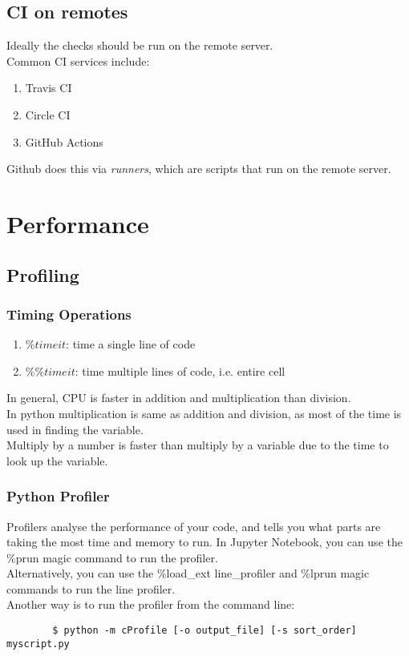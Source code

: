 \documentclass[12pt,a4paper]{article}
\begin{document}
    \subsection{CI on remotes}
    Ideally the checks should be run on the remote server.\\
    Common CI services include:
    \begin{enumerate}
        \item Travis CI
        \item Circle CI
        \item GitHub Actions
    \end{enumerate}
    Github does this via \textit{runners}, which are scripts that run on the remote server.\\

\section{Performance}
\subsection{Profiling}
    \subsubsection{Timing Operations}
    \begin{enumerate}
        \item $\% timeit$: time a single line of code
        \item $\%\% timeit$: time multiple lines of code, i.e. entire cell
    \end{enumerate}
    In general, CPU is faster in addition and multiplication than division.\\
    In python multiplication is same as addition and division, as most of the time is used in finding the variable.\\
    Multiply by a number is faster than multiply by a variable due to the time to look up the variable.\\

    \subsubsection{Python Profiler}
    Profilers analyse the performance of your code, and tells you what parts are taking the most time and memory to run. 
    In Jupyter Notebook, you can use the \%prun magic command to run the profiler.\\
    Alternatively, you can use the \%load\_ext line\_profiler and \%lprun magic commands to run the line profiler.\\
    Another way is to run the profiler from the command line: 
    \begin{lstlisting}
        $ python -m cProfile [-o output_file] [-s sort_order] myscript.py
    \end{lstlisting}
\end{document}
